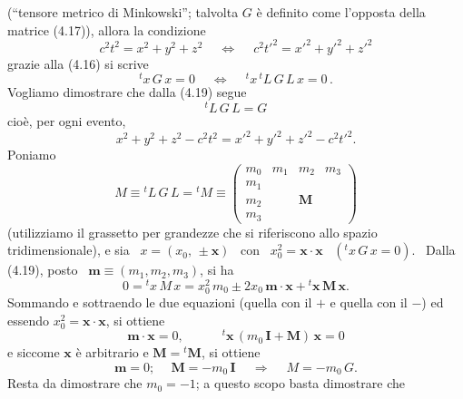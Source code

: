 \big(``tensore metrico di Minkowski''; talvolta $G$ \`e definito come l'opposta
della matrice (4.17)\big), allora la condizione
\begin{equation}
  c^2t^2=x^2+y^2+z^2\quad\ \Longleftrightarrow\quad\ c^2t'^2=x'^2+y'^2+z'^2
  \tag{4.18}
\end{equation}
grazie alla (4.16) si scrive
\begin{equation}
  {}^tx\,G\,x=0\quad\ \Longleftrightarrow\quad\ {}^tx\,{}^tL\,G\,L\,x=0\,.
  \tag{4.19}
\end{equation}
Vogliamo dimostrare che dalla (4.19) segue
\begin{equation}
  {}^tL\,G\,L=G
  \tag{4.20}
\end{equation}
cio\`e, per ogni evento,
\begin{equation}
  x^2+y^2+z^2-c^2t^2=x'^2+y'^2+z'^2-c^2t'^2.
  \tag{4.20'}
\end{equation}
Poniamo
\begin{equation}
  M\equiv{}^tL\,G\,L={}^tM\equiv\begin{pmatrix}m_0&m_1&m_2&m_3\\m_1&&&\\m_2&
  &\boldsymbol M&\\m_3&&&\end{pmatrix}
  \tag{4.21}
\end{equation}
(utilizziamo il grassetto per grandezze che si riferiscono allo spazio
tridimensionale), e sia \ $x=(x_0,\,\pm\boldsymbol x)$ \ con
\ $x_0^2=\boldsymbol x\cdot\boldsymbol x$ \ $({}^tx\,G\,x=0)$. \ Dalla (4.19),
posto \ $\boldsymbol m\equiv(m_1,m_2,m_3)$, si ha
\begin{equation}
  0={}^tx\,M\,x=x_0^2\,m_0\pm2x_0\,\boldsymbol m\cdot\boldsymbol x
  +{}^t\boldsymbol x\,\boldsymbol M\,\boldsymbol x.
  \tag{4.22}
\end{equation}
Sommando e sottraendo le due equazioni (quella con il $+$ e quella con il $-$)
ed essendo $x_0^2=\boldsymbol x\cdot\boldsymbol x$, si ottiene
\begin{equation}
  \boldsymbol m\cdot\boldsymbol x=0,\qquad
  \quad{}^t\boldsymbol x\,(m_0\,\boldsymbol I+\boldsymbol M)\,\boldsymbol x=0
  \tag{4.23}
\end{equation}
e siccome $\boldsymbol x$ \`e arbitrario e $\boldsymbol M={}^t\boldsymbol M$, si
ottiene
\begin{equation}
  \boldsymbol m=0;\quad\ \boldsymbol M=-m_0\,\boldsymbol I
  \quad\ \Rightarrow\quad\ M=-m_0\,G.
  \tag{4.24}
\end{equation}
Resta da dimostrare che $m_0=-1$; a questo scopo basta dimostrare che
